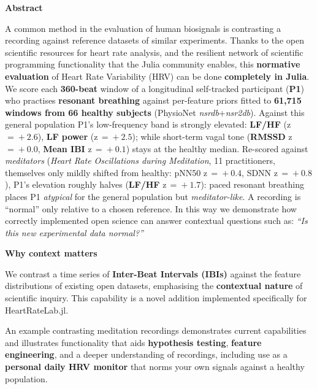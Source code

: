 \documentclass[fontsize=20pt]{scrartcl}
\newcommand{\ctitle}[2][jcgreen]{{\color{#1}\bfseries\LARGE #2}\par\vspace{4mm}}
\begin{document}
\vspace{4mm}

\noindent
\begin{minipage}[t]{0.655\linewidth}
  \begin{tcolorbox}[card]
     \ctitle{Abstract}
     {
     A common method in the evaluation of human biosignals is contrasting a recording
     against reference datasets of similar experiments. Thanks to the open scientific
     resources for heart rate analysis, and the resilient network of scientific
     programming functionality that the Julia community enables, this \textbf{normative
     evaluation} of Heart Rate Variability (HRV) can be done \textbf{completely in Julia}.
     We score each \textbf{360-beat} window of a longitudinal self-tracked participant
     (\textbf{P1}) who practises \textbf{resonant breathing} against per-feature priors
     fitted to \textbf{61{,}715 windows from 66 healthy subjects} (PhysioNet
     \emph{nsrdb}+\emph{nsr2db}). Against this general population P1's low-frequency band
     is strongly elevated: \textbf{LF/HF} (z\,$=\!+2.6$), \textbf{LF power}
     (z\,$=\!+2.5$); while short-term vagal tone (\textbf{RMSSD} z\,$=\!+0.0$,
     \textbf{Mean IBI} z\,$=\!+0.1$) stays at the healthy median. Re-scored against
     \emph{meditators} (\emph{Heart Rate Oscillations during Meditation}, 11 practitioners,
     themselves only mildly shifted from healthy: pNN50 z\,$=\!+0.4$, SDNN
     z\,$=\!+0.8$), P1's elevation roughly halves (\textbf{LF/HF} z\,$=\!+1.7$): paced
     resonant breathing places P1 \emph{atypical} for the general population but
     \emph{meditator-like}. A recording is ``normal'' only relative to a chosen reference.
     In this way we demonstrate how correctly implemented open science can answer contextual
     questions such as: \emph{``Is this new experimental data normal?''}}
  \end{tcolorbox}
\end{minipage}\hfill
\begin{minipage}[t]{0.325\linewidth}
  \begin{tcolorbox}[card, borderline west={5mm}{0mm}{jublue}]
     \ctitle[jublue]{Why context matters}
     {
     We contrast a time series of \textbf{Inter-Beat Intervals (IBIs)} against the
     feature distributions of existing open datasets, emphasising the
     \textbf{contextual nature} of scientific inquiry. This capability is a novel
     addition implemented specifically for HeartRateLab.jl.\par\vspace{4mm}
     An example contrasting meditation recordings demonstrates current capabilities
     and illustrates functionality that aids \textbf{hypothesis testing},
     \textbf{feature engineering}, and a deeper understanding of recordings,
     including use as a \textbf{personal daily HRV monitor} that norms your own
     signals against a healthy population.}
  \end{tcolorbox}
\end{minipage}
\end{document}
